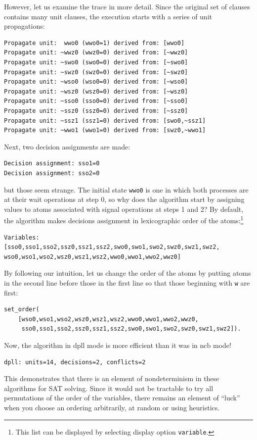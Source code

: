 \documentclass[11pt]{report}
\newcommand*{\p}[1]{\textup{\texttt{#1}}}
\begin{document}
However, let us examine the trace in more detail. Since the original set
of clauses contains many unit clauses, the execution starts with a
series of unit propagations:
\begin{verbatim}
Propagate unit:  wwo0 (wwo0=1) derived from: [wwo0]
Propagate unit: ~wwz0 (wwz0=0) derived from: [~wwz0]
Propagate unit: ~swo0 (swo0=0) derived from: [~swo0]
Propagate unit: ~swz0 (swz0=0) derived from: [~swz0]
Propagate unit: ~wso0 (wso0=0) derived from: [~wso0]
Propagate unit: ~wsz0 (wsz0=0) derived from: [~wsz0]
Propagate unit: ~sso0 (sso0=0) derived from: [~sso0]
Propagate unit: ~ssz0 (ssz0=0) derived from: [~ssz0]
Propagate unit: ~ssz1 (ssz1=0) derived from: [swo0,~ssz1]
Propagate unit: ~wwo1 (wwo1=0) derived from: [swz0,~wwo1]
\end{verbatim}
Next, two decision assignments are made:
\begin{verbatim}
Decision assignment: sso1=0
Decision assignment: sso2=0
\end{verbatim}
but those seem strange. The initial state \p{wwo0} is one in which both
processes are at their wait operations at step 0, so why does the
algorithm start by assigning values to atoms associated with signal
operations at steps 1 and 2? By default, the algorithm makes decisions
assignment in lexicographic order of the atoms:\footnote{This list can
be displayed by selecting display option \p{variable}.}
\begin{verbatim}
Variables: [sso0,sso1,sso2,ssz0,ssz1,ssz2,swo0,swo1,swo2,swz0,swz1,swz2,
wso0,wso1,wso2,wsz0,wsz1,wsz2,wwo0,wwo1,wwo2,wwz0]
\end{verbatim}
By following our
intuition, let us change the order of the atoms by putting atoms in the
second line before those in the first line so that those beginning with
\p{w} are first:
\begin{verbatim}
set_order(
    [wso0,wso1,wso2,wsz0,wsz1,wsz2,wwo0,wwo1,wwo2,wwz0,
     sso0,sso1,sso2,ssz0,ssz1,ssz2,swo0,swo1,swo2,swz0,swz1,swz2]).
\end{verbatim}
Now, the algorithm in dpll mode is more efficient than it was in ncb mode!
\begin{verbatim}
dpll: units=14, decisions=2, conflicts=2
\end{verbatim}

This demonstrates that there is an element of nondeterminism in these
algorithms for SAT solving. Since it would not be tractable to try all
permutations of the order of the variables, there remains an element of
``luck'' when you choose an ordering arbitrarily, at random or using
 heuristics.






\end{document}
